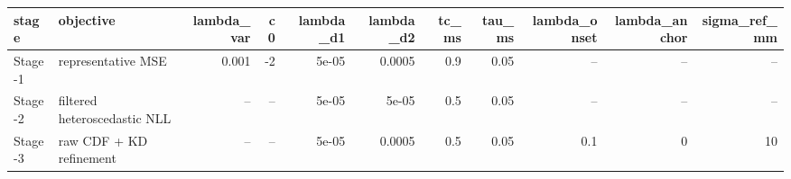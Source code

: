 \begin{tabular}{llrrrrrrrrr}
\toprule
stage & objective & lambda\_var & c0 & lambda\_d1 & lambda\_d2 & tc\_ms & tau\_ms & lambda\_onset & lambda\_anchor & sigma\_ref\_mm \\
\midrule
Stage-1 & representative MSE & 0.001 & -2 & 5e-05 & 0.0005 & 0.9 & 0.05 & -- & -- & -- \\
Stage-2 & filtered heteroscedastic NLL & -- & -- & 5e-05 & 5e-05 & 0.5 & 0.05 & -- & -- & -- \\
Stage-3 & raw CDF + KD refinement & -- & -- & 5e-05 & 0.0005 & 0.5 & 0.05 & 0.1 & 0 & 10 \\
\bottomrule
\end{tabular}
